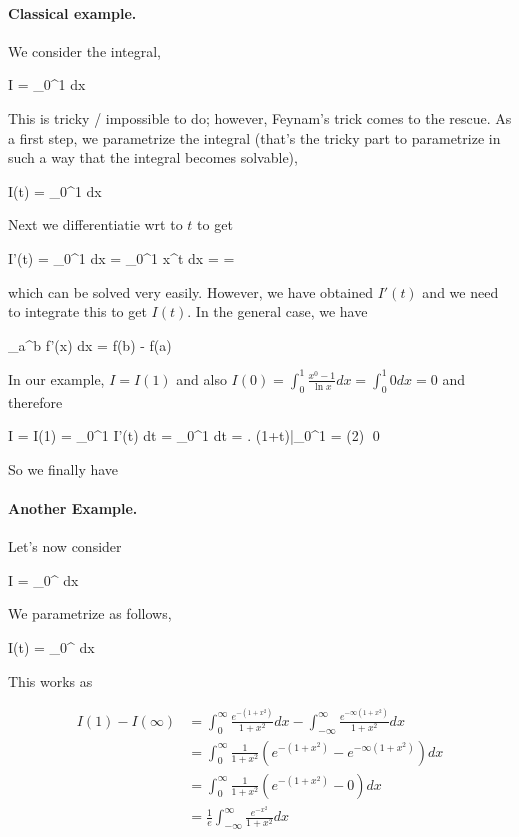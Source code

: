 \paragraph{Classical example.} We consider the integral,

\bee
I = \int_0^1  dx
\eee

This is tricky / impossible to do; however, Feynam's trick comes to the rescue. As a first step, we parametrize the integral (that's the tricky part to parametrize in such a way that the integral becomes solvable),

\bee
I(t) = \int_0^1  dx
\eee

Next we differentiatie wrt to $t$ to get

\bee
I'(t) = \int_0^1  dx = \int_0^1 x^t dx = \cdots = 
\eee

which can be solved very easily. However, we have obtained $I'(t)$ and we need to integrate this to get $I(t)$. In the general case, we have

\bee
\int_a^b f'(x) dx = f(b) - f(a)
\eee

In our example, $I = I(1)$ and also $I(0) = \int_0^1 \frac{x^0 - 1}{\ln x} dx = \int_0^1 0 dx = 0$ and therefore

\bee
I = I(1) = \int_0^1 I'(t) dt = \int_0^1 dt = \left. \ln(1+t)\right|_0^1 = \ln(2) \qed
\eee

So we finally have

\bee
{}
\eee

\paragraph{Another Example.} Let's now consider

\bee
I = \int_{0}^\infty {} dx
\eee

We parametrize as follows,

\bee
I(t) = \int_{0}^\infty {} dx
\eee

This works as

\begin{align*}
I(1) - I(\infty) &= \int_{0}^\infty \frac{e^{-(1 + x^2)}}{1 + x^2} dx - \int_{- \infty}^\infty \frac{e^{- \infty (1 + x^2)}}{1 + x^2} dx  \\
&= \int_{0}^\infty \frac{1}{1 + x^2} \left( e^{-(1 + x^2)} - e^{- \infty (1 + x^2)} \right) dx \\
&= \int_{0}^\infty \frac{1}{1 + x^2} \left( e^{-(1 + x^2)} - 0 \right) dx \\
&= \frac{1}{e} \int_{- \infty}^\infty \frac{e^{-x^2}}{1 + x^2} dx
\end{align*}


